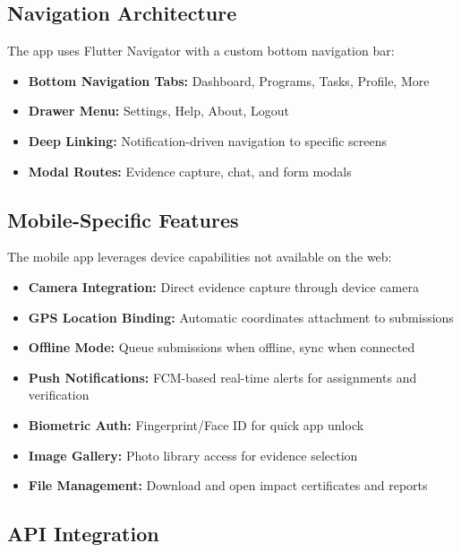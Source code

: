 \subsection{Navigation Architecture}

The app uses Flutter Navigator with a custom bottom navigation bar:

\begin{itemize}
  \item \textbf{Bottom Navigation Tabs:} Dashboard, Programs, Tasks, Profile, More
  \item \textbf{Drawer Menu:} Settings, Help, About, Logout
  \item \textbf{Deep Linking:} Notification-driven navigation to specific screens
  \item \textbf{Modal Routes:} Evidence capture, chat, and form modals
\end{itemize}

\subsection{Mobile-Specific Features}

The mobile app leverages device capabilities not available on the web:

\begin{itemize}
  \item \textbf{Camera Integration:} Direct evidence capture through device camera
  \item \textbf{GPS Location Binding:} Automatic coordinates attachment to submissions
  \item \textbf{Offline Mode:} Queue submissions when offline, sync when connected
  \item \textbf{Push Notifications:} FCM-based real-time alerts for assignments and verification
  \item \textbf{Biometric Auth:} Fingerprint/Face ID for quick app unlock
  \item \textbf{Image Gallery:} Photo library access for evidence selection
  \item \textbf{File Management:} Download and open impact certificates and reports
\end{itemize}

\subsection{API Integration}

